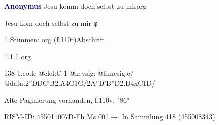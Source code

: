 \documentclass[twocolumn, 12pt]{book}
\begin{document}
\par \vspace{16pt} \textcolor{darkblue}{\textbf{Anonymus  }}\hfillplus{\textbf{[138]}}\newline Jesu komm doch selbst zu mir\newline org
\par \begin{itshape} Jesu kom doch selbst zu mir φ\end{itshape} 
\par \textcolor{darkblue}{}  1 Stimmen: org  (f.110r)\newline Abschrift
\par 1.1.1  org  
\begin{filecontents*}{138-1.code}
@clef:C-1
@keysig:
@timesig:c/
@data:2''DDC'B2.A4G1G/2A''D'B''D2.D4xC1D/
\end{filecontents*}
\newline %
\par Alte Paginierung vorhanden, f.110v: "86"
\par RISM-ID: 455011007\newline D-Fh  Ms 001\newline $\rightarrow$ In Sammlung 418 (455008343)
      
\end{document}

